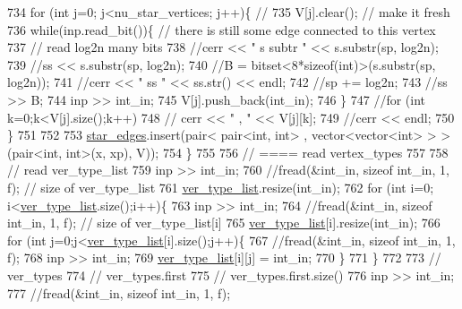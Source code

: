 \begin{DoxyCode}
734     \textcolor{keywordflow}{for} (\textcolor{keywordtype}{int} j=0; j<nu\_star\_vertices; j++)\{ \textcolor{comment}{// }
735       V[j].clear(); \textcolor{comment}{// make it fresh}
736       \textcolor{keywordflow}{while}(inp.read\_bit())\{ \textcolor{comment}{// there is still some edge connected to this vertex }
737         \textcolor{comment}{// read log2n many bits}
738         \textcolor{comment}{//cerr << " s subtr " << s.substr(sp, log2n);}
739         \textcolor{comment}{//ss << s.substr(sp, log2n);}
740         \textcolor{comment}{//B = bitset<8*sizeof(int)>(s.substr(sp, log2n));}
741         \textcolor{comment}{//cerr << " ss " << ss.str() << endl;}
742         \textcolor{comment}{//sp += log2n;}
743         \textcolor{comment}{//ss >> B;}
744         inp >> int\_in; 
745         V[j].push\_back(int\_in);
746       \}
747       \textcolor{comment}{//for (int k=0;k<V[j].size();k++)}
748       \textcolor{comment}{//  cerr << " , " << V[j][k];}
749       \textcolor{comment}{//cerr << endl;}
750     \}
751 
752 
753     \hyperlink{classmarked__graph__compressed_a7df5779d313486644132bd816937f532}{star\_edges}.insert(pair< pair<int, int> , vector<vector<int> > > (pair<int, int>(x, xp), V));
754   \}
755 
756   \textcolor{comment}{// ==== read vertex\_types}
757 
758   \textcolor{comment}{// read ver\_type\_list}
759   inp >> int\_in;
760   \textcolor{comment}{//fread(&int\_in, sizeof int\_in, 1, f); // size of ver\_type\_list}
761   \hyperlink{classmarked__graph__compressed_af2e3e55223d436628a02758dfae88493}{ver\_type\_list}.resize(int\_in);
762   \textcolor{keywordflow}{for} (\textcolor{keywordtype}{int} i=0; i<\hyperlink{classmarked__graph__compressed_af2e3e55223d436628a02758dfae88493}{ver\_type\_list}.size();i++)\{
763     inp >> int\_in;
764     \textcolor{comment}{//fread(&int\_in, sizeof int\_in, 1, f); // size of ver\_type\_list[i]}
765     \hyperlink{classmarked__graph__compressed_af2e3e55223d436628a02758dfae88493}{ver\_type\_list}[i].resize(int\_in);
766     \textcolor{keywordflow}{for} (\textcolor{keywordtype}{int} j=0;j<\hyperlink{classmarked__graph__compressed_af2e3e55223d436628a02758dfae88493}{ver\_type\_list}[i].size();j++)\{
767       \textcolor{comment}{//fread(&int\_in, sizeof int\_in, 1, f);}
768       inp >> int\_in;
769       \hyperlink{classmarked__graph__compressed_af2e3e55223d436628a02758dfae88493}{ver\_type\_list}[i][j] = int\_in;
770     \}
771   \}
772 
773   \textcolor{comment}{// ver\_types}
774   \textcolor{comment}{// ver\_types.first}
775   \textcolor{comment}{// ver\_types.first.size()}
776   inp >> int\_in;
777   \textcolor{comment}{//fread(&int\_in, sizeof int\_in, 1, f);}

\end{DoxyCode}
